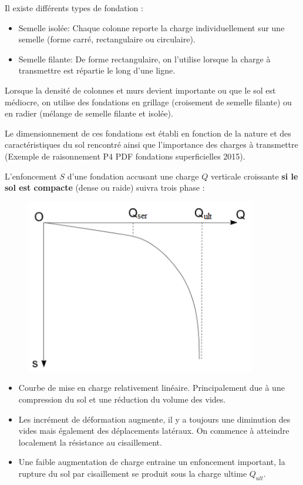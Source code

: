     Il existe différents types de fondation :
    \begin{itemize}
        \item Semelle isolée: Chaque colonne reporte la charge individuellement sur une semelle (forme carré, rectangulaire ou circulaire).
        \item Semelle filante: De forme rectangulaire, on l'utilise lorsque la charge à transmettre est répartie le long d'une ligne.
    \end{itemize}
    
    Lorsque la densité de colonnes et murs devient importante ou que le sol est médiocre, on utilise des fondations en grillage (croisement de semelle filante) ou en radier (mélange de semelle filante et isolée).
    
    Le dimensionnement de ces fondations est établi en fonction de la nature et des caractéristiques du sol rencontré ainsi que l'importance des charges à transmettre
    (Exemple de raisonnement P4 PDF fondations superficielles 2015).
    
    L'enfoncement $S$ d'une fondation accusant une charge $Q$ verticale croissante \textbf{si le sol est compacte} (dense ou raide) suivra trois phase :
    
    \begin{figure}[h!]
        \centering
        \includegraphics[scale=0.5]{Holeyman/images/H18.PNG}
    \end{figure}
    
    \begin{itemize}
        \item Courbe de mise en charge relativement linéaire. Principalement due à une compression du sol et une réduction du volume des vides.
        \item Les incrément de déformation augmente, il y a toujours une diminution des vides mais également des déplacements latéraux. On commence à atteindre localement la résistance au cisaillement.
        \item Une faible augmentation de charge entraine un enfoncement important, la rupture du sol par cisaillement se produit sous la charge ultime $Q_{ult}$.
    \end{itemize} 
    
